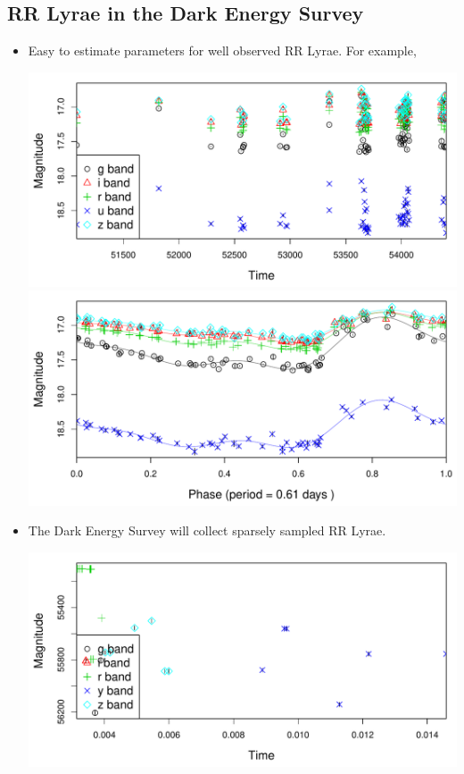 \documentclass[a0,portrait]{a0poster}
\begin{document}
\begin{multicols}{2}
\section*{RR Lyrae in the Dark Energy Survey}

\begin{itemize}
\item Easy to estimate parameters for well observed RR Lyrae. For example,

\begin{center}\vspace{1cm}
\includegraphics[width=0.49\linewidth]{unfolded.pdf}
\includegraphics[width=0.49\linewidth]{folded.pdf}
\end{center}\vspace{1cm}


\item The Dark Energy Survey will collect sparsely sampled RR Lyrae.

\begin{center}\vspace{1cm}
\includegraphics[width=0.45\linewidth]{unfolded_panstarrs.pdf}
\end{center}\vspace{1cm}



\end{itemize}
\end{multicols}
\end{document}
